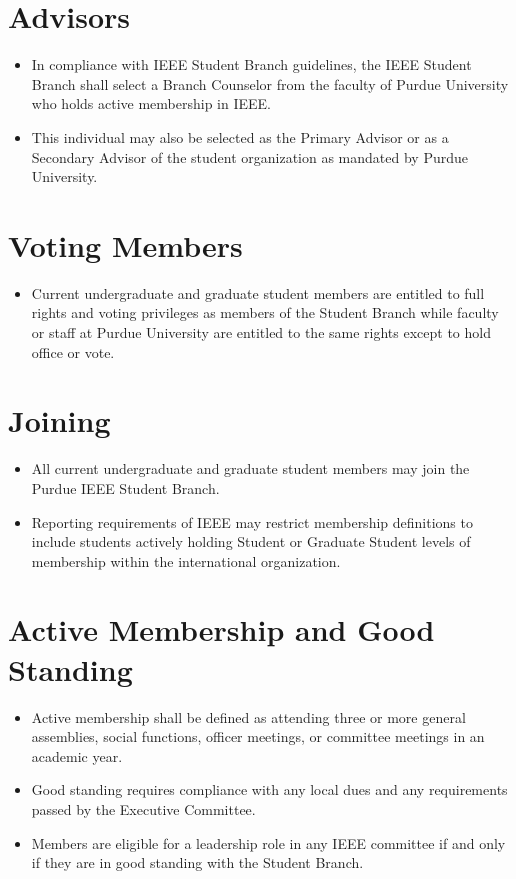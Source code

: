 \documentclass[12pt]{constitution}
\begin{document}
\section{Advisors}
\label{sec:mem_advis}
\begin{itemize}
    \item In compliance with IEEE Student Branch guidelines, the IEEE Student Branch shall select a Branch Counselor from the faculty of Purdue University who holds active membership in IEEE.
    \item This individual may also be selected as the Primary Advisor or as a Secondary Advisor of the student organization as mandated by Purdue University.
\end{itemize}

\section{Voting Members}
\label{sec:mem_vot}
\begin{itemize}
    \item Current undergraduate and graduate student members are entitled to full rights and voting privileges as members of the Student Branch while faculty or staff at Purdue University are entitled to the same rights except to hold office or vote.
\end{itemize}

\section{Joining}
\label{sec:mem_join}
\begin{itemize}
    \item All current undergraduate and graduate student members may join the Purdue IEEE Student Branch.
    \item Reporting requirements of IEEE may restrict membership definitions to include students actively holding Student or Graduate Student levels of membership within the international organization.
\end{itemize}

\section{Active Membership and Good Standing}
\label{sec:mem_active}
\begin{itemize}
    \item Active membership shall be defined as attending three or more general assemblies, social functions, officer meetings, or committee meetings in an academic year.
    \item Good standing requires compliance with any local dues and any requirements passed by the Executive Committee.
    \item Members are eligible for a leadership role in any IEEE committee if and only if they are in good standing with the Student Branch.
\end{itemize}
\end{document}
